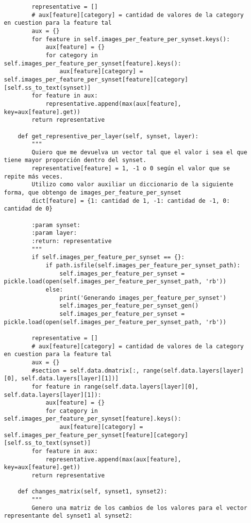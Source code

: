 \documentclass[12,twoside]{TFG-GM}
\theoremstyle{definition}
\theoremstyle{remark}
\begin{document}
\begin{verbatim}
        representative = []
        # aux[feature][category] = cantidad de valores de la category en cuestion para la feature tal
        aux = {}
        for feature in self.images_per_feature_per_synset.keys():
            aux[feature] = {}
            for category in self.images_per_feature_per_synset[feature].keys():
                aux[feature][category] = self.images_per_feature_per_synset[feature][category][self.ss_to_text(synset)]
        for feature in aux:
            representative.append(max(aux[feature], key=aux[feature].get))
        return representative

    def get_representive_per_layer(self, synset, layer):
        """
        Quiero que me devuelva un vector tal que el valor i sea el que tiene mayor proporción dentro del synset.
        representative[feature] = 1, -1 o 0 según el valor que se repite más veces.
        Utilizo como valor auxiliar un diccionario de la siguiente forma, que obtengo de images_per_feature_per_synset
        dict[feature] = {1: cantidad de 1, -1: cantidad de -1, 0: cantidad de 0}

        :param synset:
        :param layer:
        :return: representative
        """
        if self.images_per_feature_per_synset == {}:
            if path.isfile(self.images_per_feature_per_synset_path):
                self.images_per_feature_per_synset = pickle.load(open(self.images_per_feature_per_synset_path, 'rb'))
            else:
                print('Generando images_per_feature_per_synset')
                self.images_per_feature_per_synset_gen()
                self.images_per_feature_per_synset = pickle.load(open(self.images_per_feature_per_synset_path, 'rb'))

        representative = []
        # aux[feature][category] = cantidad de valores de la category en cuestion para la feature tal
        aux = {}
        #section = self.data.dmatrix[:, range(self.data.layers[layer][0], self.data.layers[layer][1])]
        for feature in range(self.data.layers[layer][0], self.data.layers[layer][1]):
            aux[feature] = {}
            for category in self.images_per_feature_per_synset[feature].keys():
                aux[feature][category] = self.images_per_feature_per_synset[feature][category][self.ss_to_text(synset)]
        for feature in aux:
            representative.append(max(aux[feature], key=aux[feature].get))
        return representative

    def changes_matrix(self, synset1, synset2):
        """
        Genero una matriz de los cambios de los valores para el vector representante del synset1 al synset2:


\end{verbatim}
\end{document}
